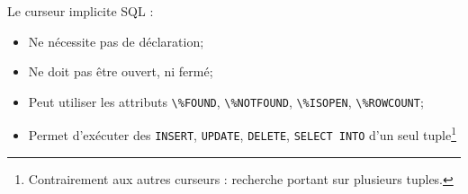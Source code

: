 \documentclass[10pt]{beamer}
\begin{document}
\begin{frame}{\secname}
    Le curseur implicite SQL :
    \begin{itemize}
        \item Ne nécessite pas de déclaration;
        \item Ne doit pas être ouvert, ni fermé;
        \item Peut utiliser les attributs \lstinline[language=plsql]!\%FOUND!, \lstinline[language=plsql]!\%NOTFOUND!, \lstinline[language=plsql]!\%ISOPEN!, \lstinline[language=plsql]!\%ROWCOUNT!;
        \item Permet d'exécuter des \lstinline[language=plsql]!INSERT!, \lstinline[language=plsql]!UPDATE!, \lstinline[language=plsql]!DELETE!, \lstinline[language=plsql]!SELECT INTO! d'un seul tuple\footnote{Contrairement aux autres curseurs : recherche portant sur plusieurs tuples.}
    \end{itemize}
\end{frame}

\begin{frame}{\secname}
    
\end{frame}

\begin{frame}[allowframebreaks]{\secname}
    
\end{frame}
\end{document}
